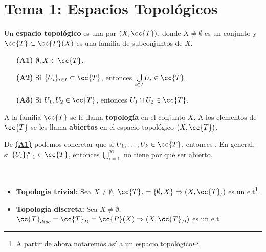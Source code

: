 
\chapter{Tema 1: Espacios Topológicos}

Un \textbf{espacio topológico} es una par $(X, \cc{T})$, donde $X \neq \emptyset$ es un conjunto y $\cc{T}\subset\cc{P}(X)$ es una familia de subconjuntos de $X$.

\begin{enumerate}
    \item[\textbf{(\hypertarget{A1}{A1})}] $\emptyset, X \in \cc{T}$.
    \item[\textbf{(\hypertarget{A2}{A2})}] Si $\{U_i\}_{i\in I} \subset \cc{T}$, entonces $\bigcup\limits_{i\in I} U_i \in \cc{T}$.
    \item[\textbf{(\hypertarget{A3}{A3})}] Si $U_1, U_2 \in \cc{T}$, entonces $U_1 \cap U_2 \in \cc{T}$.
\end{enumerate}

A la familia $\cc{T}$ se le llama \textbf{topología} en el conjunto $X$. A los elementos de $\cc{T}$ se les llama \textbf{abiertos} en el espacio topológico $(X, \cc{T})$.

\vspace*{0.5cm}

\begin{observacion}
    De \hyperlink{A1}{\textbf{(A1)}} podemos concretar que si $U_1, \dots, U_k \in \cc{T}$, entonces .
    En general, si $\{U_i\}_{i=1}^{\infty}\in \cc{T}$, entonces $\bigcup\limits_{i=1}^{\infty}$ no tiene por qué ser abierto.
\end{observacion}

\begin{ejemplo}\ 
    \begin{itemize}
        \item \textbf{Topología trivial:} Sea $X \neq \emptyset$, $\cc{T}_t = \{\emptyset, X\} \Rightarrow (X, \cc{T}_t)$ es un e.t\footnote{A partir de ahora notaremos así a un espacio topológico}.
        \item \textbf{Topología discreta:} Sea $X \neq \emptyset$, $\cc{T}_{disc}= \cc{T}_{D} = \cc{P}(X) \Rightarrow (X, \cc{T}_D)$ es un e.t.
    \end{itemize}
\end{ejemplo}
